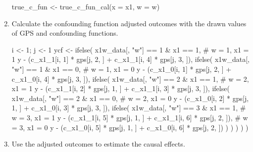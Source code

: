 \begin{enumerate}
\begin{Schunk}
\begin{Sinput}
true_c_fun <- true_c_fun_cal(x = x1, w = w)
\end{Sinput}
\end{Schunk}

\item Calculate the confounding function adjusted outcomes with the drawn values of GPS and  confounding functions.

\begin{Schunk}
\begin{Sinput}
i <- 1; j <- 1
ycf <- ifelse(
  x1w_data[, "w"] == 1 & x1 == 1,
  # w = 1, x1 = 1
  y - (c_x1_1[i, 1] * gps[j, 2, ] + c_x1_1[i, 4] * gps[j, 3, ]),
  ifelse(
    x1w_data[, "w"] == 1 & x1 == 0,
    # w = 1, x1 = 0
    y - (c_x1_0[i, 1] * gps[j, 2, ] + c_x1_0[i, 4] * gps[j, 3, ]),
    ifelse(
      x1w_data[, "w"] == 2 & x1 == 1,
      # w = 2, x1 = 1
      y - (c_x1_1[i, 2] * gps[j, 1, ] + c_x1_1[i, 3] * gps[j, 3, ]),
      ifelse(
        x1w_data[, "w"] == 2 & x1 == 0,
        # w = 2, x1 = 0
        y - (c_x1_0[i, 2] * gps[j, 1, ] + c_x1_0[i, 3] * gps[j, 3, ]),
        ifelse(
          x1w_data[, "w"] == 3 & x1 == 1,
          # w = 3, x1 = 1
          y - (c_x1_1[i, 5] * gps[j, 1, ] + c_x1_1[i, 6] * gps[j, 2, ]),
          # w = 3, x1 = 0
          y - (c_x1_0[i, 5] * gps[j, 1, ] + c_x1_0[i, 6] * gps[j, 2, ])
        )
      )
    )
  )
) 
\end{Sinput}
\end{Schunk}

\item Use the adjusted outcomes to estimate the causal effects.


\begin{Schunk}
\end{Schunk}

\end{enumerate}

